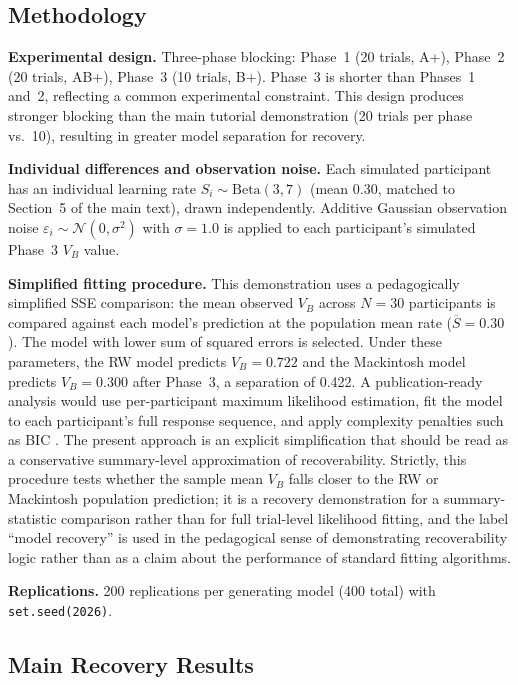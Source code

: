 \documentclass[11pt,a4paper]{article}
\begin{document}
\subsection{Methodology}
\label{sec:s3_method}

\textbf{Experimental design.} Three-phase blocking: Phase~1 (20 trials, A+), Phase~2 (20 trials, AB+), Phase~3 (10 trials, B+). Phase~3 is shorter than Phases~1 and~2, reflecting a common experimental constraint. This design produces stronger blocking than the main tutorial demonstration (20 trials per phase vs.\ 10), resulting in greater model separation for recovery.

\textbf{Individual differences and observation noise.} Each simulated participant has an individual learning rate $S_i \sim \text{Beta}(3, 7)$ (mean 0.30, matched to Section~5 of the main text), drawn independently. Additive Gaussian observation noise $\varepsilon_i \sim \mathcal{N}(0, \sigma^2)$ with $\sigma = 1.0$ is applied to each participant's simulated Phase~3 $V_B$ value.

\textbf{Simplified fitting procedure.} This demonstration uses a pedagogically simplified SSE comparison: the mean observed $V_B$ across $N = 30$ participants is compared against each model's prediction at the population mean rate ($\overline{S} = 0.30$). The model with lower sum of squared errors is selected. Under these parameters, the RW model predicts $V_B = 0.722$ and the Mackintosh model predicts $V_B = 0.300$ after Phase~3, a separation of 0.422. A publication-ready analysis would use per-participant maximum likelihood estimation, fit the model to each participant's full response sequence, and apply complexity penalties such as BIC \citep{wilson2019ten, schad2021workflow}. The present approach is an explicit simplification that should be read as a conservative summary-level approximation of recoverability. Strictly, this procedure tests whether the sample mean $V_B$ falls closer to the RW or Mackintosh population prediction; it is a recovery demonstration for a summary-statistic comparison rather than for full trial-level likelihood fitting, and the label ``model recovery'' is used in the pedagogical sense of demonstrating recoverability logic rather than as a claim about the performance of standard fitting algorithms.

\textbf{Replications.} 200 replications per generating model (400 total) with \texttt{set.seed(2026)}.

\subsection{Main Recovery Results}
\label{sec:s3_main}
\end{document}
